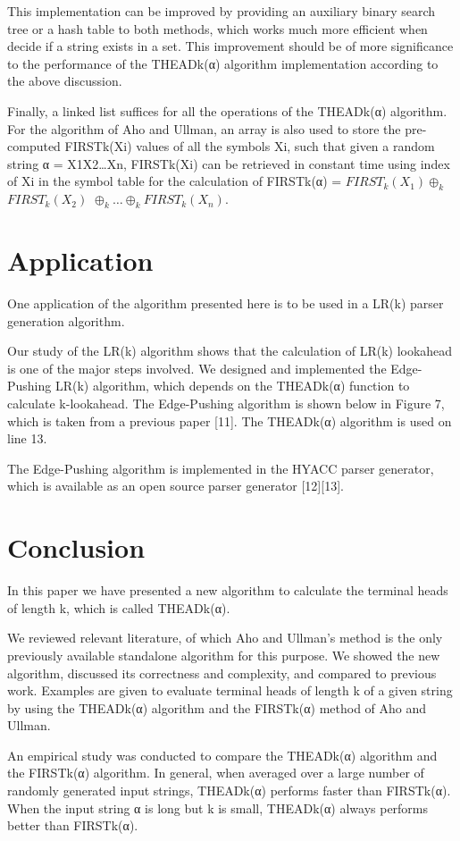 \documentclass{sig-alternate-05-2015}
\begin{document}
This implementation can be improved by providing an
auxiliary binary search tree or a hash table to both methods,
which works much more efficient when decide if a string
exists in a set. This improvement should be of more significance
to the performance of the THEADk(α) algorithm
implementation according to the above discussion.

Finally, a linked list suffices for all the operations of the
THEADk(α) algorithm. For the algorithm of Aho and
Ullman, an array is also used to store the pre-computed
FIRSTk(Xi) values of all the symbols Xi, such that given a
random string α = X1X2…Xn, FIRSTk(Xi) can be retrieved
in constant time using index of Xi in the symbol table for
the calculation of FIRSTk(α) = $FIRST_k(X_1)\oplus_k$
$FIRST_k(X_2)$ $\oplus_k …\oplus_k FIRST_k(X_n)$.

\section{Application}
One application of the algorithm presented here is to be
used in a LR(k) parser generation algorithm.

Our study of the LR(k) algorithm shows that the calculation
of LR(k) lookahead is one of the major steps involved.
We designed and implemented the Edge-Pushing LR(k)
algorithm, which depends on the THEADk(α) function to
calculate k-lookahead. The Edge-Pushing algorithm is
shown below in Figure 7, which is taken from a previous
paper [11]. The THEADk(α) algorithm is used on line 13.

The Edge-Pushing algorithm is implemented in the
HYACC parser generator, which is available as an open
source parser generator [12][13].

\section{Conclusion}
In this paper we have presented a new algorithm to calculate
the terminal heads of length k, which is called
THEADk(α).

We reviewed relevant literature, of which Aho and
Ullman’s method is the only previously available
standalone algorithm for this purpose.
We showed the new algorithm, discussed its correctness
and complexity, and compared to previous work. Examples
are given to evaluate terminal heads of length k of a given
string by using the THEADk(α) algorithm and the
FIRSTk(α) method of Aho and Ullman.

An empirical study was conducted to compare the
THEADk(α) algorithm and the FIRSTk(α) algorithm. In
general, when averaged over a large number of randomly
generated input strings, THEADk(α) performs faster than
FIRSTk(α). When the input string α is long but k is small,
THEADk(α) always performs better than FIRSTk(α).
\end{document}
